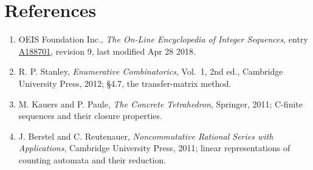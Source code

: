 \documentclass[11pt]{article}
\theoremstyle{definition}
\begin{document}
\section{References}

\begin{enumerate}

\item OEIS Foundation Inc., \emph{The On-Line Encyclopedia of Integer Sequences}, entry \href{https://oeis.org/A188701}{A188701}, revision 9, last modified Apr 28 2018.

\item R. P. Stanley, \emph{Enumerative Combinatorics}, Vol.~1, 2nd ed., Cambridge University Press, 2012; \S4.7, the transfer-matrix method.

\item M. Kauers and P. Paule, \emph{The Concrete Tetrahedron}, Springer, 2011; C-finite sequences and their closure properties.

\item J. Berstel and C. Reutenauer, \emph{Noncommutative Rational Series with Applications}, Cambridge University Press, 2011; linear representations of counting automata and their reduction.

\end{enumerate}
\end{document}
